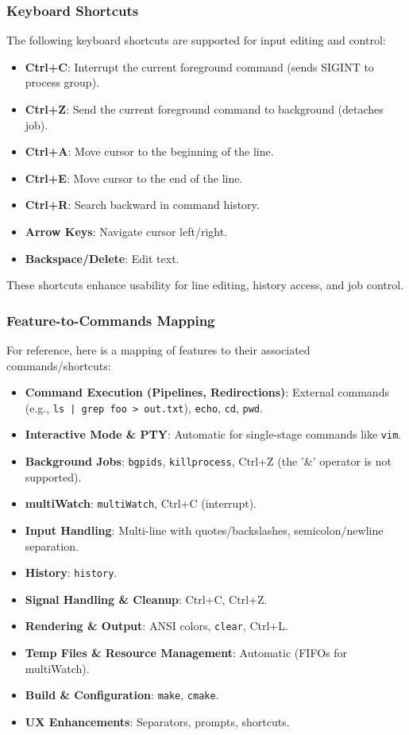 \documentclass[11pt,a4paper]{article}
\begin{document}
\subsubsection{Keyboard Shortcuts}
The following keyboard shortcuts are supported for input editing and control:

\begin{itemize}[leftmargin=*]
  \item \textbf{Ctrl+C}: Interrupt the current foreground command (sends SIGINT to process group).
  \item \textbf{Ctrl+Z}: Send the current foreground command to background (detaches job).
  \item \textbf{Ctrl+A}: Move cursor to the beginning of the line.
  \item \textbf{Ctrl+E}: Move cursor to the end of the line.
  \item \textbf{Ctrl+R}: Search backward in command history.
  \item \textbf{Arrow Keys}: Navigate cursor left/right.
  \item \textbf{Backspace/Delete}: Edit text.
\end{itemize}
These shortcuts enhance usability for line editing, history access, and job control.

\subsubsection{Feature-to-Commands Mapping}
For reference, here is a mapping of features to their associated commands/shortcuts:

\begin{itemize}[leftmargin=*]
  \item \textbf{Command Execution (Pipelines, Redirections)}: External commands (e.g., \texttt{ls | grep foo > out.txt}), \texttt{echo}, \texttt{cd}, \texttt{pwd}.
  \item \textbf{Interactive Mode \& PTY}: Automatic for single-stage commands like \texttt{vim}.
  \item \textbf{Background Jobs}: \texttt{bgpids}, \texttt{killprocess}, Ctrl+Z (the '&' operator is not supported).
  \item \textbf{multiWatch}: \texttt{multiWatch}, Ctrl+C (interrupt).
  \item \textbf{Input Handling}: Multi-line with quotes/backslashes, semicolon/newline separation.
  \item \textbf{History}: \texttt{history}.
  \item \textbf{Signal Handling \& Cleanup}: Ctrl+C, Ctrl+Z.
  \item \textbf{Rendering \& Output}: ANSI colors, \texttt{clear}, Ctrl+L.
  \item \textbf{Temp Files \& Resource Management}: Automatic (FIFOs for multiWatch).
  \item \textbf{Build \& Configuration}: \texttt{make}, \texttt{cmake}.
  \item \textbf{UX Enhancements}: Separators, prompts, shortcuts.
\end{itemize}
\end{document}
